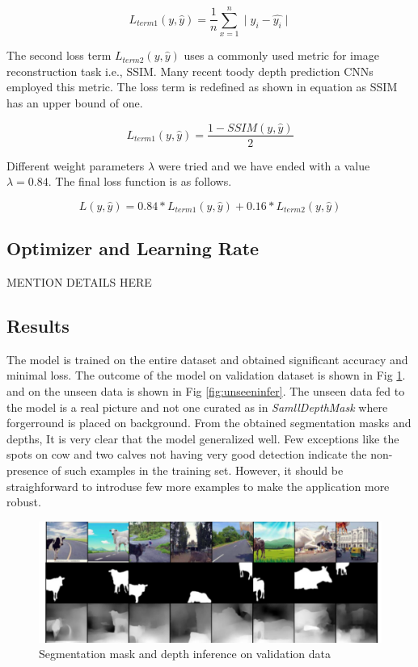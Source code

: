 \documentclass[review]{cvpr}
\begin{document}
\begin{equation}
L_{term1}(y, \hat{y}) = \frac{1}{n} \sum_{x=1}^{n} \mid y_i - \hat{y_i} \mid
\end{equation}

The second loss term $L_{term2}(y, \hat{y})$ uses a commonly used metric for image reconstruction task i.e., SSIM. Many recent toody depth prediction CNNs employed this metric. The loss term is redefined as shown in equation as SSIM has an upper bound of one.

\begin{equation}
L_{term1}(y, \hat{y}) = \frac{1 - SSIM(y, \hat{y})}{2}
\end{equation}

Different weight parameters $\lambda$ were tried and we have ended with a value $\lambda = 0.84$. The final loss function is as follows.

\begin{equation}
L(y, \hat{y}) = 0.84 \ast L_{term1}(y, \hat{y}) + 0.16 \ast L_{term2}(y, \hat{y})
\end{equation}

\subsection{Optimizer and Learning Rate}
MENTION DETAILS HERE

\subsection{Results}
The model is trained on the entire dataset and obtained significant accuracy and minimal loss. The outcome of the model on validation dataset is shown in Fig \ref{fig:validinfer}. and on the unseen data is shown in Fig \ref{fig:unseeninfer}. The unseen data fed to the model is a real picture and not one curated as in \textit{SamllDepthMask} where forgerround is placed on background. From the obtained segmentation masks and depths, It is very clear that the model generalized well. Few exceptions like the spots on cow and two calves not having very good detection indicate the non-presence of such examples in the training set. However, it should be straighforward to introduse few more examples to make the application more robust.

\begin{figure}
  \begin{center}
    \includegraphics[width=1\textwidth]{validinference.png}
  \end{center}
  \caption{Segmentation mask and depth inference on validation data}
  \label{fig:validinfer}
\end{figure}
\end{document}
